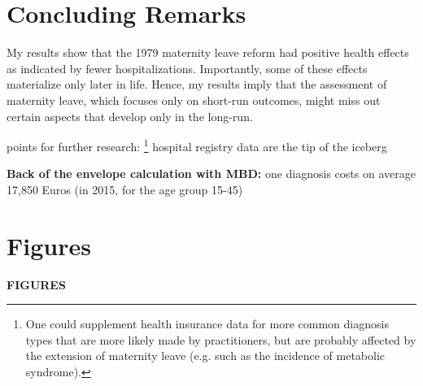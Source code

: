 \documentclass[11pt, a4paper,draft]{article} %
\begin{document}
\section{Concluding Remarks}\label{sec:conclusion}

My results show that the 1979 maternity leave reform had positive health effects as indicated by fewer hospitalizations. Importantly, some of these effects materialize only later in life. Hence, my results imply that the assessment of maternity leave, which focuses only on short-run outcomes, might miss out certain aspects that develop only in the long-run.

 
 
points for further research: 
\footnote{One could supplement health insurance data for more common diagnosis types that are more likely made by practitioners, but are probably affected by the extension of maternity leave (e.g. such as the incidence of metabolic syndrome).}
hospital registry data are the tip of the iceberg 
 
 
 
\textbf{Back of the envelope calculation with MBD:} one diagnosis costs on average 17,850 Euros (in 2015, for the age group 15-45) %
 





\newpage






\newpage
\TODO\section{Figures}
\vspace*{\fill}
{\Huge \begin{center}\textbf{FIGURES}\end{center}}
\vspace*{\fill}\clearpage
\end{document}
